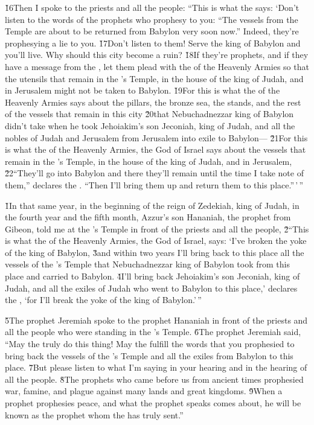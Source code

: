 \v{16}Then I spoke to the priests and all the people: ``This is what the  says: `Don't listen to the words of the prophets who prophesy to you: ``The vessels from the Temple are about to be returned from Babylon very soon now.'' Indeed, they're prophesying a lie to you. \v{17}Don't listen to them! Serve the king of Babylon and you'll live. Why should this city become a ruin? \v{18}If they're prophets, and if they have a message from the , let them plead with the  of the Heavenly Armies so that the utensils that remain in the 's Temple, in the house of the king of Judah, and in Jerusalem might not be taken to Babylon. \v{19}For this is what the  of the Heavenly Armies says about the pillars, the bronze sea, the stands, and the rest of the vessels that remain in this city \v{20}that Nebuchadnezzar king of Babylon didn't take when he took Jehoiakim's son Jeconiah, king of Judah, and all the nobles of Judah and Jerusalem from Jerusalem into exile to Babylon--- \v{21}For this is what the  of the Heavenly Armies, the God of Israel says about the vessels that remain in the 's Temple, in the house of the king of Judah, and in Jerusalem, \v{22}``They'll go into Babylon and there they'll remain until the time I take note of them,'' declares the . ``Then I'll bring them up and return them to this place.''\,'\,''

\v{1}In that same year, in the beginning of the reign of Zedekiah, king of Judah, in the fourth year and the fifth month, Azzur's son Hananiah, the prophet from Gibeon, told me at the 's Temple in front of the priests and all the people, \v{2}``This is what the  of the Heavenly Armies, the God of Israel, says: `I've broken the yoke of the king of Babylon, \v{3}and within two years I'll bring back to this place all the vessels of the 's Temple that Nebuchadnezzar king of Babylon took from this place and carried to Babylon. \v{4}I'll bring back Jehoiakim's son Jeconiah, king of Judah, and all the exiles of Judah who went to Babylon to this place,' declares the , `for I'll break the yoke of the king of Babylon.'\,''

\v{5}The prophet Jeremiah spoke to the prophet Hananiah in front of the priests and all the people who were standing in the 's Temple. \v{6}The prophet Jeremiah said, ``May the  truly do this thing! May the  fulfill the words that you prophesied to bring back the vessels of the 's Temple and all the exiles from Babylon to this place. \v{7}But please listen to what I'm saying in your hearing and in the hearing of all the people. \v{8}The prophets who came before us from ancient times prophesied war, famine, and plague against many lands and great kingdoms. \v{9}When a prophet prophesies peace, and what the prophet speaks comes about, he will be known as the prophet whom the  has truly sent.''

